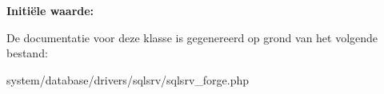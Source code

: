 {\bfseries Initi\"{e}le waarde\+:}
\begin{DoxyCode}{0}
\DoxyCodeLine{        \textcolor{stringliteral}{'TINYINT'}   => \textcolor{stringliteral}{'SMALLINT'},}
\DoxyCodeLine{        \textcolor{stringliteral}{'SMALLINT'}  => \textcolor{stringliteral}{'INT'},}
\DoxyCodeLine{        \textcolor{stringliteral}{'INT'}       => \textcolor{stringliteral}{'BIGINT'},}
\DoxyCodeLine{        \textcolor{stringliteral}{'REAL'}      => \textcolor{stringliteral}{'FLOAT'}}
\DoxyCodeLine{    )}

\end{DoxyCode}


De documentatie voor deze klasse is gegenereerd op grond van het volgende bestand\+:\begin{DoxyCompactItemize}
\item 
system/database/drivers/sqlsrv/sqlsrv\+\_\+forge.\+php\end{DoxyCompactItemize}
